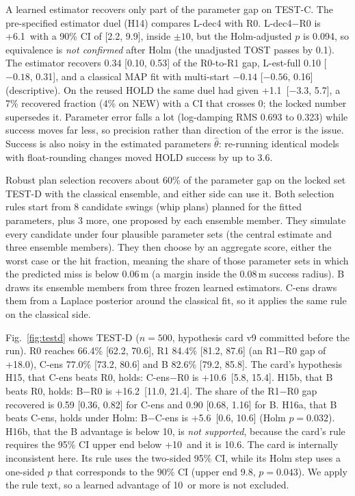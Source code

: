 A learned estimator recovers only part of the parameter gap on TEST-C. The pre-specified estimator duel (H14) compares L-dec4 with R0. L-dec4$-$R0 is +6.1\pp\ with a 90\% CI of [2.2, 9.9], inside $\pm10$\pp, but the Holm-adjusted $p$ is 0.094, so equivalence is \emph{not confirmed} after Holm (the unadjusted TOST passes by 0.1\pp). The estimator recovers 0.34 [0.10, 0.53] of the R0-to-R1 gap, L-est-full 0.10 [$-0.18$, 0.31], and a classical MAP fit with multi-start $-0.14$ [$-0.56$, 0.16] (descriptive). On the reused HOLD the same duel had given +1.1\pp\ [$-3.3$, 5.7], a 7\% recovered fraction (4\% on NEW) with a CI that crosses 0; the locked number supersedes it. Parameter error falls a lot (log-damping RMS 0.693 to 0.323) while success moves far less, so precision rather than direction of the error is the issue. Success is also noisy in the estimated parameters $\hat\theta$: re-running identical models with float-rounding changes moved HOLD success by up to 3.6\pp.

Robust plan selection recovers about 60\% of the parameter gap on the locked set TEST-D with the classical ensemble, and either side can use it. Both selection rules start from 8 candidate swings (whip plans) planned for the fitted parameters, plus 3 more, one proposed by each ensemble member. They simulate every candidate under four plausible parameter sets (the central estimate and three ensemble members). They then choose by an aggregate score, either the worst case or the hit fraction, meaning the share of those parameter sets in which the predicted miss is below 0.06\,m (a margin inside the 0.08\,m success radius). B draws its ensemble members from three frozen learned estimators. C-ens draws them from a Laplace posterior around the classical fit, so it applies the same rule on the classical side.

Fig.~\ref{fig:testd} shows TEST-D ($n{=}500$, hypothesis card v9 committed before the run). R0 reaches 66.4\% [62.2, 70.6], R1 84.4\% [81.2, 87.6] (an R1$-$R0 gap of +18.0\pp), C-ens 77.0\% [73.2, 80.6] and B 82.6\% [79.2, 85.8]. The card's hypothesis H15, that C-ens beats R0, holds: C-ens$-$R0 is +10.6\pp\ [5.8, 15.4]. H15b, that B beats R0, holds: B$-$R0 is +16.2\pp\ [11.0, 21.4]. The share of the R1$-$R0 gap recovered is 0.59 [0.36, 0.82] for C-ens and 0.90 [0.68, 1.16] for B. H16a, that B beats C-ens, holds under Holm: B$-$C-ens is +5.6\pp\ [0.6, 10.6] (Holm $p=0.032$). H16b, that the B advantage is below 10\pp, is \emph{not supported}, because the card's rule requires the 95\% CI upper end below +10\pp\ and it is 10.6. The card is internally inconsistent here. Its rule uses the two-sided 95\% CI, while its Holm step uses a one-sided $p$ that corresponds to the 90\% CI (upper end 9.8, $p=0.043$). We apply the rule text, so a learned advantage of 10\pp\ or more is not excluded.

